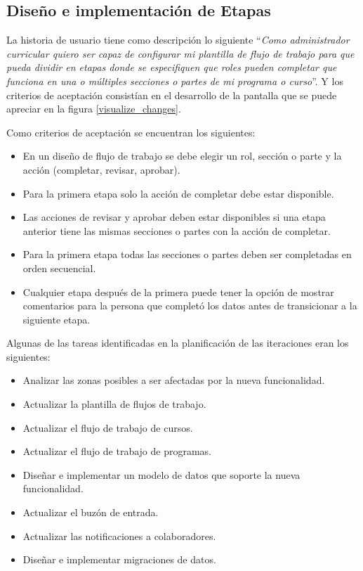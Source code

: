 \subsection{Diseño e implementación de Etapas}
La historia de usuario tiene como descripción lo siguiente \enquote{\textit{Como administrador curricular quiero ser capaz de configurar mi plantilla de flujo de trabajo para que pueda dividir en etapas donde se especifiquen que roles pueden completar que funciona en una o múltiples secciones o partes de mi programa o curso}}. Y los criterios de aceptación consistían en el desarrollo de la pantalla que se puede apreciar en la figura \ref{visualize_changes}.

Como criterios de aceptación se encuentran los siguientes:
\begin{itemize}
	\item En un diseño de flujo de trabajo se debe elegir un rol, sección o parte y la acción (completar, revisar, aprobar).
	\item Para la primera etapa solo la acción de completar debe estar disponible.
	\item Las acciones de revisar y aprobar deben estar disponibles si una etapa anterior tiene las mismas secciones o partes con la acción de completar.
	\item Para la primera etapa todas las secciones o partes deben ser completadas en orden secuencial.
	\item Cualquier etapa después de la primera puede tener la opción de mostrar comentarios para la persona que completó los datos antes de transicionar a la siguiente etapa.
\end{itemize}

Algunas de las tareas identificadas en la planificación de las iteraciones eran los siguientes:
\begin{itemize}
	\item Analizar las zonas posibles a ser afectadas por la nueva funcionalidad.
	\item Actualizar la plantilla de flujos de trabajo.
	\item Actualizar el flujo de trabajo de cursos.
	\item Actualizar el flujo de trabajo de programas.
	\item Diseñar e implementar un modelo de datos que soporte la nueva funcionalidad.
	\item Actualizar el buzón de entrada.
	\item Actualizar las notificaciones a colaboradores.
	\item Diseñar e implementar migraciones de datos.
\end{itemize}

